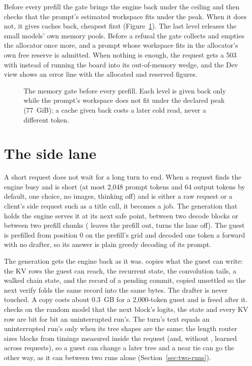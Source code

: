 Before every prefill the gate brings the engine back under the ceiling and then checks that the prompt's estimated workspace fits under the peak. When it does not, it gives caches back, cheapest first (Figure~\ref{fig:memory-gate}). The last level releases the small models' own memory pools. Before a refusal the gate collects and empties the allocator once more, and a prompt whose workspace fits in the allocator's own free reserve is admitted. When nothing is enough, the request gets a 503 with  instead of running the board into its out-of-memory wedge, and the Dev view shows an error line with the allocated and reserved figures.

\begin{figure}[htbp]
\centering

\caption[The memory gate]{The memory gate before every prefill. Each level is given back only while the prompt's workspace does not fit under the declared peak (77~GiB); a cache given back costs a later cold read, never a different token.}\label{fig:memory-gate}
\end{figure}

\section{The side lane}\label{sec:side-lane}

A short request does not wait for a long turn to end. When a request finds the engine busy and is short (at most 2,048 prompt tokens and 64 output tokens by default, one choice, no images, thinking off) and is either a raw request or a client's side request such as a title call, it becomes a job. The generation that holds the engine serves it at its next safe point, between two decode blocks or between two prefill chunks ( leaves the prefill out,  turns the lane off). The guest is prefilled from position 0 on the prefill's grid and decoded one token a forward with no drafter, so its answer is plain greedy decoding of its prompt.

The generation gets the engine back as it was.   copies what the guest can write: the KV rows the guest can reach, the recurrent state, the convolution tails, a walked chain state, and the record of a pending commit, copied unsettled so the next verify folds the same record into the same bytes. The drafter is never touched. A copy costs about 0.3~GB for a 2,000-token guest and is freed after it.  checks on the random model that the next block's logits, the state and every KV row are bit for bit an uninterrupted run's. The turn's text equals an uninterrupted run's only when its tree shapes are the same: the length router sizes blocks from timings measured inside the request (and, without , learned across requests), so a guest can change a later tree and a near tie can go the other way, as it can between two runs alone (Section~\ref{sec:two-runs}).

